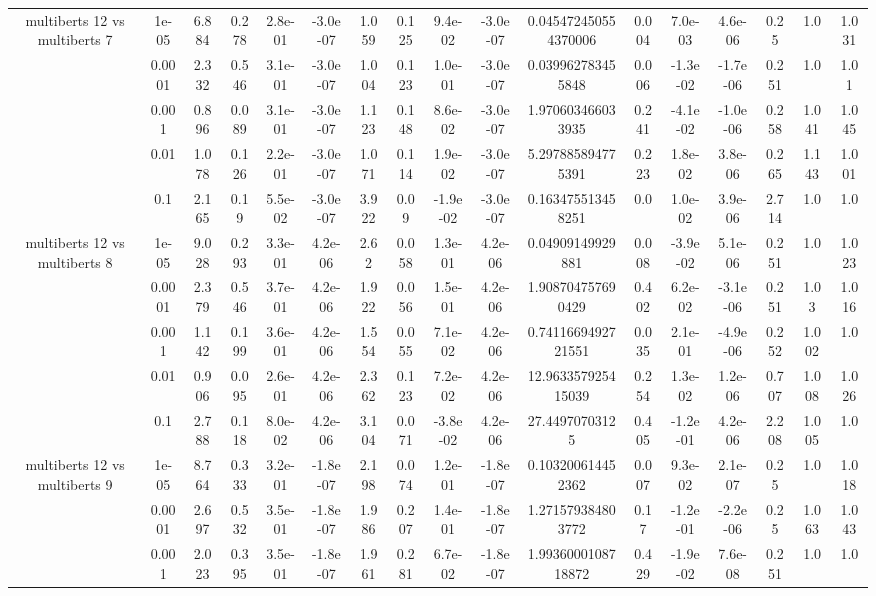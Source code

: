\begin{tabular}{|c|c|c|c|c|c|c|c|c|c|c|c|c|c|c|c|c|}
\hline
\multirow{5}{*}{multiberts 12 vs multiberts 7} & 1e-05 & 6.884 & 0.278 & 2.8e-01 & -3.0e-07 & 1.059 & 0.125 & 9.4e-02 & -3.0e-07 & 0.045472450554370006 & 0.004 & 7.0e-03 & 4.6e-06 & 0.25 & 1.0 & 1.031 \\
 & 0.0001 & 2.332 & 0.546 & 3.1e-01 & -3.0e-07 & 1.004 & 0.123 & 1.0e-01 & -3.0e-07 & 0.039962783455848 & 0.006 & -1.3e-02 & -1.7e-06 & 0.251 & 1.0 & 1.01 \\
 & 0.001 & 0.896 & 0.089 & 3.1e-01 & -3.0e-07 & 1.123 & 0.148 & 8.6e-02 & -3.0e-07 & 1.970603466033935 & 0.241 & -4.1e-02 & -1.0e-06 & 0.258 & 1.041 & 1.045 \\
 & 0.01 & 1.078 & 0.126 & 2.2e-01 & -3.0e-07 & 1.071 & 0.114 & 1.9e-02 & -3.0e-07 & 5.297885894775391 & 0.223 & 1.8e-02 & 3.8e-06 & 0.265 & 1.143 & 1.001 \\
 & 0.1 & 2.165 & 0.19 & 5.5e-02 & -3.0e-07 & 3.922 & 0.09 & -1.9e-02 & -3.0e-07 & 0.163475513458251 & 0.0 & 1.0e-02 & 3.9e-06 & 2.714 & 1.0 & 1.0 \\
\hline
\multirow{5}{*}{multiberts 12 vs multiberts 8} & 1e-05 & 9.028 & 0.293 & 3.3e-01 & 4.2e-06 & 2.62 & 0.058 & 1.3e-01 & 4.2e-06 & 0.04909149929881 & 0.008 & -3.9e-02 & 5.1e-06 & 0.251 & 1.0 & 1.023 \\
 & 0.0001 & 2.379 & 0.546 & 3.7e-01 & 4.2e-06 & 1.922 & 0.056 & 1.5e-01 & 4.2e-06 & 1.908704757690429 & 0.402 & 6.2e-02 & -3.1e-06 & 0.251 & 1.03 & 1.016 \\
 & 0.001 & 1.142 & 0.199 & 3.6e-01 & 4.2e-06 & 1.554 & 0.055 & 7.1e-02 & 4.2e-06 & 0.7411669492721551 & 0.035 & 2.1e-01 & -4.9e-06 & 0.252 & 1.002 & 1.0 \\
 & 0.01 & 0.906 & 0.095 & 2.6e-01 & 4.2e-06 & 2.362 & 0.123 & 7.2e-02 & 4.2e-06 & 12.963357925415039 & 0.254 & 1.3e-02 & 1.2e-06 & 0.707 & 1.008 & 1.026 \\
 & 0.1 & 2.788 & 0.118 & 8.0e-02 & 4.2e-06 & 3.104 & 0.071 & -3.8e-02 & 4.2e-06 & 27.44970703125 & 0.405 & -1.2e-01 & 4.2e-06 & 2.208 & 1.005 & 1.0 \\
\hline
\multirow{5}{*}{multiberts 12 vs multiberts 9} & 1e-05 & 8.764 & 0.333 & 3.2e-01 & -1.8e-07 & 2.198 & 0.074 & 1.2e-01 & -1.8e-07 & 0.103200614452362 & 0.007 & 9.3e-02 & 2.1e-07 & 0.25 & 1.0 & 1.018 \\
 & 0.0001 & 2.697 & 0.532 & 3.5e-01 & -1.8e-07 & 1.986 & 0.207 & 1.4e-01 & -1.8e-07 & 1.271579384803772 & 0.17 & -1.2e-01 & -2.2e-06 & 0.25 & 1.063 & 1.043 \\
 & 0.001 & 2.023 & 0.395 & 3.5e-01 & -1.8e-07 & 1.961 & 0.281 & 6.7e-02 & -1.8e-07 & 1.9936000108718872 & 0.429 & -1.9e-02 & 7.6e-08 & 0.251 & 1.0 & 1.0 \\

\end{tabular}
